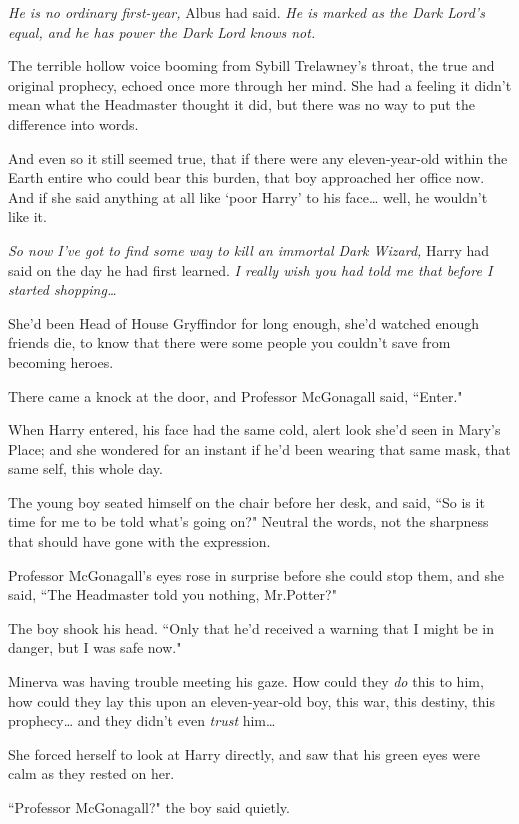 \emph{He is no ordinary first-year,} Albus had said. \emph{He is marked as the Dark Lord's equal, and he has power the Dark Lord knows not.}

The terrible hollow voice booming from Sybill Trelawney's throat, the true and original prophecy, echoed once more through her mind. She had a feeling it didn't mean what the Headmaster thought it did, but there was no way to put the difference into words.

And even so it still seemed true, that if there were any eleven-year-old within the Earth entire who could bear this burden, that boy approached her office now. And if she said anything at all like `poor Harry' to his face{\ldots} well, he wouldn't like it.

\emph{So now I've got to find some way to kill an immortal Dark Wizard,} Harry had said on the day he had first learned. \emph{I really wish you had told me that before I started shopping{\ldots}}

She'd been Head of House Gryffindor for long enough, she'd watched enough friends die, to know that there were some people you couldn't save from becoming heroes.

There came a knock at the door, and Professor McGonagall said, ``Enter."

When Harry entered, his face had the same cold, alert look she'd seen in Mary's Place; and she wondered for an instant if he'd been wearing that same mask, that same self, this whole day.

The young boy seated himself on the chair before her desk, and said, ``So is it time for me to be told what's going on?" Neutral the words, not the sharpness that should have gone with the expression.

Professor McGonagall's eyes rose in surprise before she could stop them, and she said, ``The Headmaster told you nothing, Mr.\?Potter?"

The boy shook his head. ``Only that he'd received a warning that I might be in danger, but I was safe now."

Minerva was having trouble meeting his gaze. How could they \emph{do} this to him, how could they lay this upon an eleven-year-old boy, this war, this destiny, this prophecy{\ldots} and they didn't even \emph{trust} him{\ldots}

She forced herself to look at Harry directly, and saw that his green eyes were calm as they rested on her.

``Professor McGonagall?" the boy said quietly.

